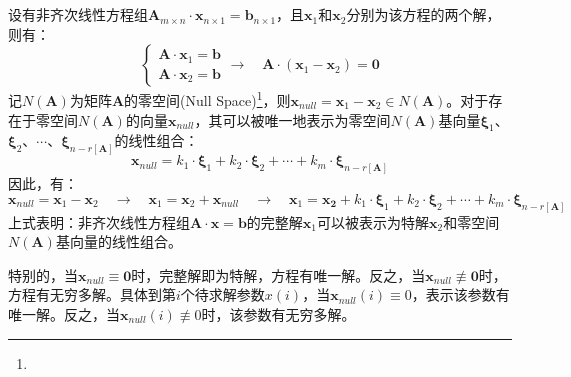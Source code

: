 \newpage
\chapter{}

\section{}
\label{sect:null_space}
设有非齐次线性方程组$\boldsymbol{A}_{m\times n}\cdot\boldsymbol{x}_{n\times 1}=\boldsymbol{b}_{n\times 1}$，且$\boldsymbol{x}_1$和$\boldsymbol{x}_2$分别为该方程的两个解，则有：
\begin{equation}
  \begin{cases}
    \boldsymbol{A}\cdot\boldsymbol{x}_1=\boldsymbol{b} \\\boldsymbol{A}\cdot\boldsymbol{x}_2=\boldsymbol{b}
  \end{cases}\to\quad\boldsymbol{A}\cdot(\boldsymbol{x}_1-\boldsymbol{x}_2)=\boldsymbol{0}
\end{equation}
记$N(\boldsymbol{A})$为矩阵$\boldsymbol{A}$的零空间(Null Space)\footnote{}，则$\boldsymbol{x}_{null}=\boldsymbol{x}_1-\boldsymbol{x}_2\in N(\boldsymbol{A})$。对于存在于零空间$N(\boldsymbol{A})$的向量$\boldsymbol{x}_{null}$，其可以被唯一地表示为零空间$N(\boldsymbol{A})$基向量$\boldsymbol{\xi}_1$、$\boldsymbol{\xi}_2$、$\cdots$、$\boldsymbol{\xi}_{n-r[\boldsymbol{A}]}$的线性组合：
\begin{equation}
  \boldsymbol{x}_{null}=k_1\cdot\boldsymbol{\xi}_1+k_2\cdot\boldsymbol{\xi}_2+\cdots+k_m\cdot\boldsymbol{\xi}_{n-r[\boldsymbol{A}]}
\end{equation}
因此，有：
\begin{equation}
  \boldsymbol{x}_{null}=\boldsymbol{x}_1-\boldsymbol{x}_2\quad\to\quad\boldsymbol{x}_1=\boldsymbol{x}_2+\boldsymbol{x}_{null}\quad\to\quad\boldsymbol{x}_1=\boldsymbol{x_2}+k_1\cdot\boldsymbol{\xi}_1+k_2\cdot\boldsymbol{\xi}_2+\cdots+k_m\cdot\boldsymbol{\xi}_{n-r[\boldsymbol{A}]}
\end{equation}
上式表明：非齐次线性方程组$\boldsymbol{A}\cdot\boldsymbol{x}=\boldsymbol{b}$的完整解$\boldsymbol{x}_1$可以被表示为特解$\boldsymbol{x}_2$和零空间$N(\boldsymbol{A})$基向量的线性组合。

特别的，当$\boldsymbol{x}_{null}\equiv\boldsymbol{0}$时，完整解即为特解，方程有唯一解。反之，当$\boldsymbol{x}_{null}\not\equiv\boldsymbol{0}$时，方程有无穷多解。具体到第$i$个待求解参数$x(i)$，当$\boldsymbol{x}_{null}(i)\equiv0$，表示该参数有唯一解。反之，当$\boldsymbol{x}_{null}(i)\not\equiv0$时，该参数有无穷多解。

